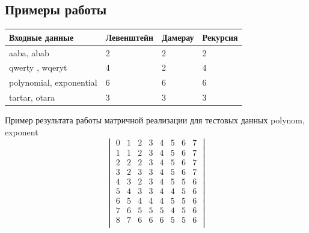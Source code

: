 \documentclass[12pt]{article}
\begin{document}
\subsection{Примеры работы}
\begin{center}
	\begin{tabular}{| l | l | l | l |}
		\hline
		Входные данные & Левенштейн & Дамерау & Рекурсия \\ \hline
		aaba, abab & 2 & 2 & 2 \\ \hline
		qwerty , wqeryt & 4 & 2 & 4 \\ \hline
		polynomial, exponential & 6 & 6 & 6 \\ \hline
		tartar, otara & 3 & 3 & 3 \\ \hline
		\hline
	\end{tabular}
\newline
Пример результата работы матричной реализации для тестовых данных polynom, exponent
\newline
$$\begin{vmatrix} 
0 & 1 & 2 & 3 & 4 & 5 & 6 & 7 \\
1 & 1 & 2 & 3 & 4 & 5 & 6 & 7 \\ 
2 & 2 & 2 & 3 & 4 & 5 & 6 & 7 \\ 
3 & 2 & 3 & 3 & 4 & 5 & 6 & 7 \\ 
4 & 3 & 2 & 3 & 4 & 5 & 5 & 6 \\ 
5 & 4 & 3 & 3 & 4 & 4 & 5 & 6 \\ 
6 & 5 & 4 & 4 & 4 & 5 & 5 & 6 \\ 
7 & 6 & 5 & 5 & 5 & 4 & 5 & 6 \\ 
8 & 7 & 6 & 6 & 6 & 5 & 5 & 6 \\
\end{vmatrix}$$
\end{center}
\end{document}

